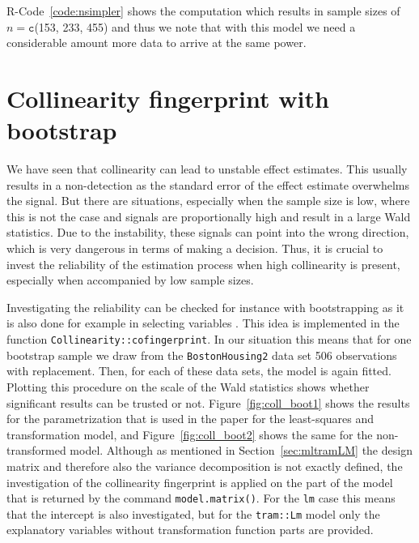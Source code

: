 \documentclass[11pt,a4paper,twoside]{book}\usepackage[]{graphicx}\usepackage[]{xcolor}
\begin{document}
\textsf{R}-Code~\ref{code:nsimpler} shows the computation which results in sample sizes of $n=\texttt{c}$(153, 233, 455) and thus we note that with this model we need a considerable amount more data to arrive at the same power.

\section{Collinearity fingerprint with bootstrap}

We have seen that collinearity can lead to unstable effect estimates. This usually results in a non-detection as the standard error of the effect estimate overwhelms the signal. But there are situations, especially when the sample size is low, where this is not the case and signals are proportionally high and result in a large Wald statistics. Due to the instability, these signals can point into the wrong direction, which is very dangerous in terms of making a decision. Thus, it is crucial to invest the reliability of the estimation process when high collinearity is present, especially when accompanied by low sample sizes.

Investigating the reliability can be checked for instance with bootstrapping \citep{Efron1986} as it is also done for example in selecting variables \citep{Altman1989,Heinze2018}.
This idea is implemented in the function \texttt{Collinearity::cofingerprint}.
In our situation this means that for one bootstrap sample we draw from the \texttt{BostonHousing2} data set 506 observations with replacement. Then, for each of these data sets, the model is again fitted. Plotting this procedure on the scale of the Wald statistics shows whether significant results can be trusted or not. Figure~\ref{fig:coll_boot1} shows the results for the parametrization that is used in the paper for the least-squares and transformation model, and Figure~\ref{fig:coll_boot2} shows the same for the non-transformed model. Although as mentioned in Section~\ref{sec:mltramLM} the design matrix and therefore also the variance decomposition is not exactly defined, the investigation of the collinearity fingerprint is applied on the part of the model that is returned by the command \texttt{model.matrix()}. For the \texttt{lm} case this means that the intercept is also investigated, but for the \texttt{tram::Lm} model only the explanatory variables without transformation function parts are provided.
\end{document}
